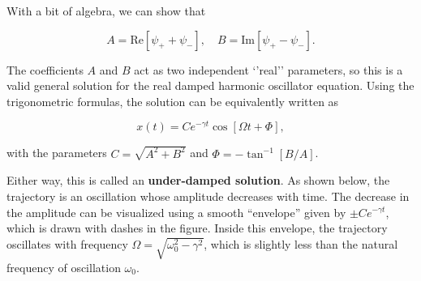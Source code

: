 \documentclass[11pt]{article}
\begin{document}
With a bit of algebra, we can show that

\[A = \mathrm{Re}\left[\psi_+ + \psi_-\right], \quad B = \mathrm{Im}\left[\psi_+ - \psi_-\right].\]

The coefficients \(A\) and \(B\) act as two independent `'real''
parameters, so this is a valid general solution for the real damped
harmonic oscillator equation. Using the trigonometric formulas, the
solution can be equivalently written as

\[x(t) = C e^{-\gamma t} \cos\left[\Omega t + \Phi\right],\]

with the parameters \(C = \sqrt{A^2 + B^2}\) and
\(\Phi = - \tan^{-1}\left[B/A\right]\).

Either way, this is called an \textbf{under-damped solution}. As shown
below, the trajectory is an oscillation whose amplitude decreases with
time. The decrease in the amplitude can be visualized using a smooth
``envelope'' given by \(\pm C e^{-\gamma t}\), which is drawn with
dashes in the figure. Inside this envelope, the trajectory oscillates
with frequency \(\Omega = \sqrt{\omega_0^2 - \gamma^2}\), which is
slightly less than the natural frequency of oscillation \(\omega_0\).
\end{document}
